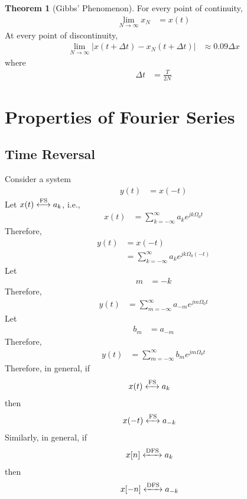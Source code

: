 \documentclass[titlepage, fleqn, a4paper, 12pt, twoside]{article}
\theoremstyle{definition}
\theoremstyle{theorem}
\newtheorem{theorem}{Theorem}
\newcommand{\FS}{\xleftrightarrow{\mathrm{FS}}}
\newcommand{\DFS}{\xleftrightarrow{\mathrm{DFS}}}
\begin{document}
\begin{theorem}[Gibbs' Phenomenon]
	For every point of continuity,
	\begin{align*}
		\lim\limits_{N \to \infty} x_N &= x(t)
	\end{align*}
	At every point of discontinuity,
	\begin{align*}
		\lim\limits_{N \to \infty} \left| x(t + \Delta t) - x_N(t + \Delta t) \right| &\approx 0.09 \Delta x
	\end{align*}
	where
	\begin{align*}
		\Delta t &= \frac{T}{2 N}
	\end{align*}
	\label{thm:Gibbs'_Phenomenon}
\end{theorem}

\section{Properties of Fourier Series}

\subsection{Time Reversal}

Consider a system
\begin{align*}
	y(t) &= x(-t)
\end{align*}
Let $x(t) \FS a_k$, i.e.,
\begin{align*}
	x(t) &= \sum\limits_{k = -\infty}^{\infty} a_k e^{j k \Omega_0 t}
\end{align*}
Therefore,
\begin{align*}
	y(t) &= x(-t)\\
	&= \sum\limits_{k = -\infty}^{\infty} a_k e^{j k \Omega_0 (-t)}
\end{align*}
Let
\begin{align*}
	m &= -k
\end{align*}
Therefore,
\begin{align*}
	y(t) &= \sum\limits_{m = -\infty}^{\infty} a_{-m} e^{j m \Omega_0 t}
\end{align*}
Let
\begin{align*}
	b_m &= a_{-m}
\end{align*}
Therefore,
\begin{align*}
	y(t) &= \sum\limits_{m = -\infty}^{\infty} b_m e^{j m \Omega_0 t}
\end{align*}
Therefore, in general, if
\begin{align*}
	x(t) &\FS a_k
\end{align*}
then
\begin{align*}
	x(-t) &\FS a_{-k}
\end{align*}
Similarly, in general, if
\begin{align*}
	x[n] &\DFS a_k
\end{align*}
then
\begin{align*}
	x[-n] &\DFS a_{-k}
\end{align*}
\end{document}
